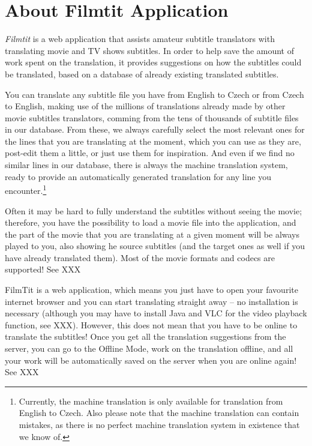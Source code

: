 \label{chap:users_manual}

\section{About Filmtit Application}

\emph{Filmtit} is a web application that assists amateur subtitle translators with translating movie and TV shows subtitles. In order to help save the amount of work spent on the translation, it provides suggestions on how the subtitles could be translated, based on a database of already existing translated subtitles.

You can translate any subtitle file you have from English to Czech or from Czech to English, making use of the millions of translations already made by other movie subtitles translators, comming from the tens of thousands of subtitle files in our database. From these, we always carefully select the most relevant ones for the lines that you are translating at the moment, which you can use as they are, post-edit them a little, or just use them for inspiration. And even if we find no similar lines in our database, there is always the machine translation system, ready to provide an automatically generated translation for any line you encounter.\footnote{Currently, the machine translation is only available for translation from English to Czech. Also please note that the machine translation can contain mistakes, as there is no perfect machine translation system in existence that we know of.}

Often it may be hard to fully understand the subtitles without seeing the movie; therefore, you have the possibility to load a movie file into the application, and the part of the movie that you are translating at a given moment will be always played to you, also showing he source subtitles (and the target ones as well if you have already translated them). Most of the movie formats and codecs are supported! See XXX

FilmTit is a web application, which means you just have to open your favourite internet browser and you can start translating straight away -- no installation is necessary (although you may have to install Java and VLC for the video playback function, see XXX). However, this does not mean that you have to be online to translate the subtitles! Once you get all the translation suggestions from the server, you can go to the Offline Mode, work on the translation offline, and all your work will be automatically saved on the server when you are online again! See XXX

